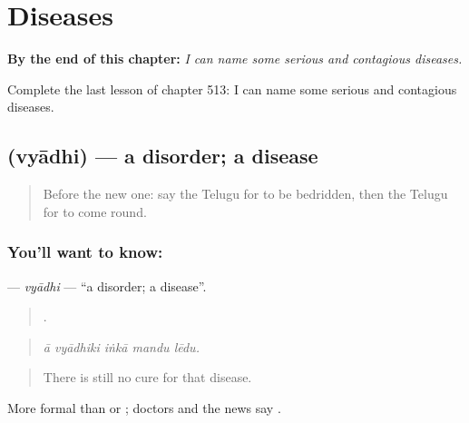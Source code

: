 
\chapter{Diseases}
\label{ch:te-diseases}

\begin{chapteropening}
\textbf{By the end of this chapter:} \emph{I can name some serious and contagious diseases.}

Complete the last lesson of chapter 513: I can name some serious and contagious diseases.
\end{chapteropening}

\section[\texorpdfstring{\te{వ్యాధి} (vyādhi)}{వ్యాధి (vyādhi)}]{ (vyādhi) — a disorder; a disease}

\label{lesson:TE-C513-vyadhi}



\begin{quote}
Before the new one: say the Telugu for to be bedridden, then the Telugu for to come round.
\end{quote}

\subsection*{You'll want to know: }
\textbf{} — \emph{vyādhi} — \textquotedblleft{}a disorder; a disease\textquotedblright{}.

\begin{quote}
    .
\end{quote}

\begin{quote}
\emph{ā vyādhiki iṅkā mandu lēdu.}
\end{quote}

\begin{quote}
There is still no cure for that disease.
\end{quote}

More formal than  or ; doctors and the news say .

